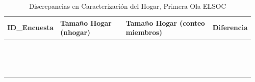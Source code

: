 \documentclass[
]{book}
\begin{document}
\begin{table}

\caption{\label{tab:unnamed-chunk-17}\label{tab:estratos}Discrepancias en Caracterización del Hogar, Primera Ola ELSOC}
\centering
\begin{tabular}[t]{>{\raggedright\arraybackslash}p{5cm}>{\raggedright\arraybackslash}p{3cm}>{\raggedright\arraybackslash}p{3cm}>{\raggedright\arraybackslash}p{2cm}}
\toprule
ID\_Encuesta & Tamaño Hogar (nhogar) & Tamaño Hogar (conteo miembros) & Diferencia\\
\midrule
\cellcolor{white}{1101132} & \cellcolor{white}{4} & \cellcolor{white}{3} & \cellcolor{white}{1}\\
\cellcolor{white}{2101041} & \cellcolor{white}{6} & \cellcolor{white}{5} & \cellcolor{white}{1}\\
\cellcolor{white}{3101143} & \cellcolor{white}{9} & \cellcolor{white}{8} & \cellcolor{white}{1}\\
\cellcolor{white}{3301233} & \cellcolor{white}{7} & \cellcolor{white}{6} & \cellcolor{white}{1}\\
\cellcolor{white}{4204012} & \cellcolor{white}{4} & \cellcolor{white}{3} & \cellcolor{white}{1}\\
\addlinespace
\cellcolor{white}{4301221} & \cellcolor{white}{3} & \cellcolor{white}{2} & \cellcolor{white}{1}\\
\cellcolor{white}{5101154} & \cellcolor{white}{6} & \cellcolor{white}{5} & \cellcolor{white}{\vphantom{1} 1}\\
\cellcolor{white}{5101154} & \cellcolor{white}{6} & \cellcolor{white}{5} & \cellcolor{white}{1}\\
\cellcolor{white}{5101403} & \cellcolor{white}{5} & \cellcolor{white}{4} & \cellcolor{white}{1}\\
\cellcolor{white}{5101536} & \cellcolor{white}{5} & \cellcolor{white}{4} & \cellcolor{white}{1}\\
\addlinespace
\cellcolor{white}{5103033} & \cellcolor{white}{5} & \cellcolor{white}{4} & \cellcolor{white}{1}\\
\cellcolor{white}{5109152} & \cellcolor{white}{5} & \cellcolor{white}{4} & \cellcolor{white}{1}\\
\cellcolor{white}{5109242} & \cellcolor{white}{6} & \cellcolor{white}{5} & \cellcolor{white}{1}\\
\cellcolor{white}{5402021} & \cellcolor{white}{3} & \cellcolor{white}{2} & \cellcolor{white}{1}\\
\cellcolor{white}{5701143} & \cellcolor{white}{3} & \cellcolor{white}{2} & \cellcolor{white}{1}\\

\end{tabular}
\end{table}
\end{document}

